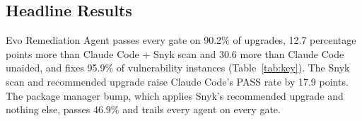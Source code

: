 \documentclass[11pt]{article}
\theoremstyle{definition}
\newcommand{\bench}{VulnBump}
\newcommand{\evo}{Evo Remediation Agent}
\newcommand{\aided}{Claude Code + Snyk scan}
\newcommand{\unaided}{Claude Code unaided}
\newcommand{\pmbump}{package manager bump}
\begin{document}
\subsection{Headline Results}
\label{sec:headline}

\begin{table}[htbp]
\centering
\caption{Key results on \bench{}, with Claude Sonnet 5.5 for all agents; the \pmbump{} is the non-agentic baseline. Gate and PASS rates are out of 307 upgrades. \emph{Targeted vulnerabilities fixed} is the rescan gate. Vulnerability instances are out of 2{,}066 (Section~\ref{sec:metrics}).}
\label{tab:key}
\end{table}

\evo{} passes every gate on 90.2\% of upgrades, 12.7 percentage points more than \aided{} and 30.6 more than \unaided{}, and fixes 95.9\% of vulnerability instances (Table~\ref{tab:key}). The Snyk scan and recommended upgrade raise Claude Code's PASS rate by 17.9 points. The \pmbump{}, which applies Snyk's recommended upgrade and nothing else, passes 46.9\% and trails every agent on every gate.
\end{document}
